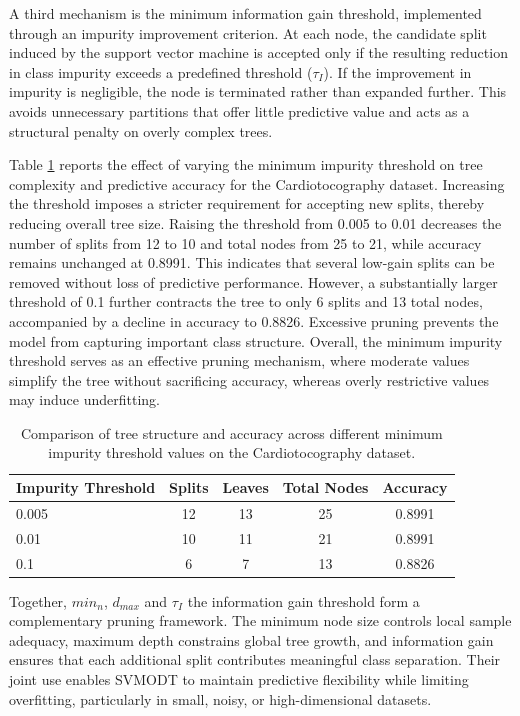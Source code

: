 A third mechanism is the minimum information gain threshold, implemented through an impurity improvement criterion. At each node, the candidate split induced by the support vector machine is accepted only if the resulting reduction in class impurity exceeds a predefined threshold (\(\tau_I\)). If the improvement in impurity is negligible, the node is terminated rather than expanded further. This avoids unnecessary partitions that offer little predictive value and acts as a structural penalty on overly complex trees.

Table \ref{tab:min-impurity-table-latex} reports the effect of varying the minimum impurity threshold on tree complexity and predictive accuracy for the Cardiotocography dataset. Increasing the threshold imposes a stricter requirement for accepting new splits, thereby reducing overall tree size. Raising the threshold from 0.005 to 0.01 decreases the number of splits from 12 to 10 and total nodes from 25 to 21, while accuracy remains unchanged at 0.8991. This indicates that several low-gain splits can be removed without loss of predictive performance. However, a substantially larger threshold of 0.1 further contracts the tree to only 6 splits and 13 total nodes, accompanied by a decline in accuracy to 0.8826. Excessive pruning prevents the model from capturing important class structure. Overall, the minimum impurity threshold serves as an effective pruning mechanism, where moderate values simplify the tree without sacrificing accuracy, whereas overly restrictive values may induce underfitting.

\begin{table}
\centering
\caption{\label{tab:min-impurity-table-latex}Comparison of tree structure and accuracy across different minimum impurity threshold values on the Cardiotocography dataset.}
\centering
\fontsize{8}{10}\selectfont
\begin{tabular}[t]{l|c|c|c|c}
\hline
Impurity Threshold & Splits & Leaves & Total Nodes & Accuracy\\
\hline
0.005 & 12 & 13 & 25 & 0.8991\\
\hline
0.01 & 10 & 11 & 21 & 0.8991\\
\hline
0.1 & 6 & 7 & 13 & 0.8826\\
\hline
\end{tabular}
\end{table}

Together, \({min_n}\), \(d_{max}\) and \(\tau_I\) the information gain threshold form a complementary pruning framework. The minimum node size controls local sample adequacy, maximum depth constrains global tree growth, and information gain ensures that each additional split contributes meaningful class separation. Their joint use enables SVMODT to maintain predictive flexibility while limiting overfitting, particularly in small, noisy, or high-dimensional datasets.

